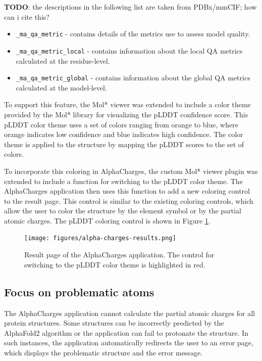 \documentclass[
  digital,     %
  oneside,     %
  nosansbold,  %
  nocolorbold, %
  lof,         %
  lot,         %
]{fithesis4}
\begin{document}
\textbf{TODO}: the descriptions in the following list are taken from PDBx/mmCIF; how can i cite this? \\

\begin{itemize}
  \item \texttt{\_ma\_qa\_metric} - contains details of the metrics use to assess model quality.
  \item \texttt{\_ma\_qa\_metric\_local} - contains information about the local QA metrics calculated at the residue-level.
  \item \texttt{\_ma\_qa\_metric\_global} - contains information about the global QA metrics calculated at the model-level.
\end{itemize}

To support this feature, the Mol* viewer was extended to include a color theme provided by the Mol* library for visualizing the pLDDT confidence score. This pLDDT color theme uses a set of colors ranging from orange to blue, where orange indicates low confidence and blue indicates high confidence. The color theme is applied to the structure by mapping the pLDDT scores to the set of colors.

To incorporate this coloring in AlphaCharges, the custom Mol* viewer plugin was extended to include a function for switching to the pLDDT color theme. The AlphaCharges application then uses this function to add a new coloring control to the result page. This control is similar to the existing coloring controls, which allow the user to color the structure by the element symbol or by the partial atomic charges. The pLDDT coloring control is shown in Figure \ref{fig:alpha-charges-results}.

\begin{figure}[htbp]
  \begin{center}
    \texttt{[image: figures/alpha-charges-results.png]}
  \end{center}
  \caption{Result page of the AlphaCharges application. The control for switching to the pLDDT color theme is highlighted in red.}
  \label{fig:alpha-charges-results}
\end{figure}

\subsection{Focus on problematic atoms}

The AlphaCharges application cannot calculate the partial atomic charges for all protein structures. Some structures can be incorrectly predicted by the AlphaFold2 algorithm or the application can fail to protonate the structure.
\cite{jumper2021alphafold} In such instances, the application automatically redirects the user to an error page, which displays the problematic structure and the error message.
\end{document}
